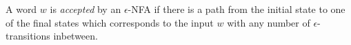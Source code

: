 

\setcounter{section}{1}
\setcounter{subsection}{4}
\setcounter{dfn}{12}


A word $w$ is \emph{accepted} by an $\epsilon$-NFA if
there is a path from the initial state to one of the final states which corresponds to the input $w$
with any number of $\epsilon$-transitions inbetween.




